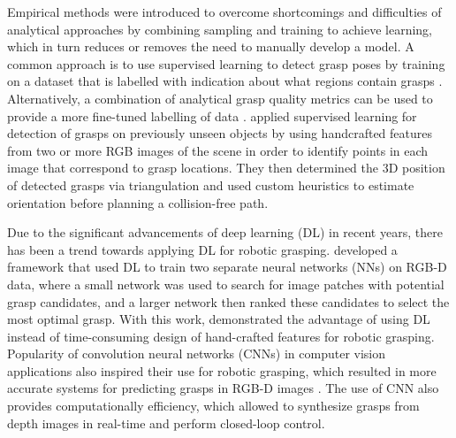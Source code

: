 Empirical methods were introduced to overcome shortcomings and difficulties of analytical approaches by combining sampling and training to achieve learning, which in turn reduces or removes the need to manually develop a model. A common approach is to use supervised learning to detect grasp poses by training on a dataset that is labelled with indication about what regions contain grasps \cite{saxena_robotic_2008, lenz_deep_2015}. Alternatively, a combination of analytical grasp quality metrics can be used to provide a more fine-tuned labelling of data \cite{mahler_dex-net_2017, mahler_dex-net_2018, mahler_learning_2019, lundell_robust_2019}. \citet{saxena_robotic_2008} applied supervised learning for detection of grasps on previously unseen objects by using handcrafted features from two or more RGB images of the scene in order to identify points in each image that correspond to grasp locations. They then determined the 3D position of detected grasps via triangulation and used custom heuristics to estimate orientation before planning a collision-free path.

Due to the significant advancements of deep learning (DL) in recent years, there has been a trend towards applying DL for robotic grasping. \citet{lenz_deep_2015} developed a framework that used DL to train two separate neural networks (NNs) on RGB-D data, where a small network was used to search for image patches with potential grasp candidates, and a larger network then ranked these candidates to select the most optimal grasp. With this work, \citeauthor{lenz_deep_2015} demonstrated the advantage of using DL instead of time-consuming design of hand-crafted features for robotic grasping. Popularity of convolution neural networks (CNNs) in computer vision applications also inspired their use for robotic grasping, which resulted in more accurate systems for predicting grasps in RGB-D images \cite{redmon_real-time_2015, kumra_robotic_2017}. The use of CNN also provides computationally efficiency, which allowed \citet{morrison_closing_2018} to synthesize grasps from depth images in real-time and perform closed-loop control.

